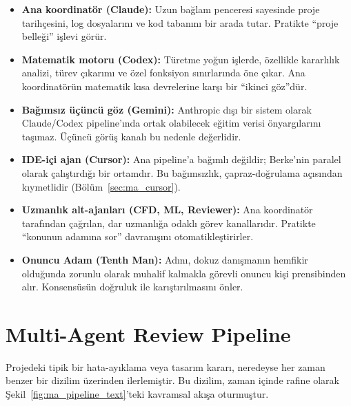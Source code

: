 \begin{itemize}
  \item \textbf{Ana koordinatör (Claude):} Uzun bağlam penceresi
        sayesinde proje tarihçesini, log dosyalarını ve kod tabanını
        bir arada tutar. Pratikte ``proje belleği'' işlevi görür.
  \item \textbf{Matematik motoru (Codex):} Türetme yoğun işlerde,
        özellikle kararlılık analizi, türev çıkarımı ve özel fonksiyon
        sınırlarında öne çıkar. Ana koordinatörün matematik kısa
        devrelerine karşı bir ``ikinci göz''dür.
  \item \textbf{Bağımsız üçüncü göz (Gemini):} Anthropic dışı bir
        sistem olarak Claude/Codex pipeline'ında ortak olabilecek
        eğitim verisi önyargılarını taşımaz. Üçüncü görüş kanalı bu
        nedenle değerlidir.
  \item \textbf{IDE-içi ajan (Cursor):} Ana pipeline'a bağımlı değildir;
        Berke'nin paralel olarak çalıştırdığı bir ortamdır. Bu
        bağımsızlık, çapraz-doğrulama açısından kıymetlidir
        (Bölüm~\ref{sec:ma_cursor}).
  \item \textbf{Uzmanlık alt-ajanları (CFD, ML, Reviewer):} Ana
        koordinatör tarafından çağrılan, dar uzmanlığa odaklı görev
        kanallarıdır. Pratikte ``konunun adamına sor'' davranışını
        otomatikleştirirler.
  \item \textbf{Onuncu Adam (Tenth Man):} Adını, dokuz danışmanın
        hemfikir olduğunda zorunlu olarak muhalif kalmakla görevli
        onuncu kişi prensibinden alır. Konsensüsün doğruluk ile
        karıştırılmasını önler.
\end{itemize}

\section{Multi-Agent Review Pipeline}
\label{sec:ma_pipeline}

Projedeki tipik bir hata-ayıklama veya tasarım kararı, neredeyse her
zaman benzer bir dizilim üzerinden ilerlemiştir. Bu dizilim, zaman
içinde rafine olarak Şekil~\ref{fig:ma_pipeline_text}'teki kavramsal
akışa oturmuştur.

